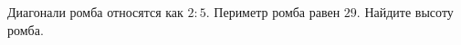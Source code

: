 \begin{ex}
	\begin{condition}
		Диагонали ромба относятся как \( 2 : 5 \). Периметр ромба равен \( 29 \). Найдите высоту ромба.
	\end{condition}
\end{ex}